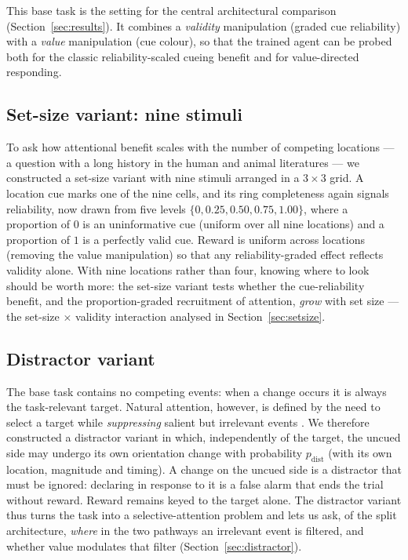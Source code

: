 This base task is the setting for the central architectural comparison
(Section~\ref{sec:results}). It combines a \emph{validity} manipulation (graded cue
reliability) with a \emph{value} manipulation (cue colour), so that the trained
agent can be probed both for the classic reliability-scaled cueing benefit and for
value-directed responding.

\subsection{Set-size variant: nine stimuli}
\label{sec:env-setsize}
To ask how attentional benefit scales with the number of competing locations --- a
question with a long history in the human and animal literatures
\citep{palmer1995psychophysics, mazyar2012does, eckstein2013visual} --- we
constructed a set-size variant with nine stimuli arranged in a $3\times3$ grid. A
location cue marks one of the nine cells, and its ring completeness again signals
reliability, now drawn from five levels $\{0, 0.25, 0.50, 0.75, 1.00\}$, where a
proportion of $0$ is an uninformative cue (uniform over all nine locations) and a
proportion of $1$ is a perfectly valid cue. Reward is uniform across locations
(removing the value manipulation) so that any reliability-graded effect reflects
validity alone. With nine locations rather than four, knowing where to look should
be worth more: the set-size variant tests whether the cue-reliability benefit, and
the proportion-graded recruitment of attention, \emph{grow} with set size --- the
set-size $\times$ validity interaction analysed in Section~\ref{sec:setsize}.

\subsection{Distractor variant}
\label{sec:env-distractor}
The base task contains no competing events: when a change occurs it is always the
task-relevant target. Natural attention, however, is defined by the need to select
a target while \emph{suppressing} salient but irrelevant events
\citep{desimone1995neural, sprague2018rescuing, cosman2018prefrontal}. We therefore
constructed a distractor variant in which, independently of the target, the uncued
side may undergo its own orientation change with probability $p_{\mathrm{dist}}$
(with its own location, magnitude and timing). A change on the uncued side is a
distractor that must be ignored: declaring in response to it is a false alarm that
ends the trial without reward. Reward remains keyed to the target alone. The
distractor variant thus turns the task into a selective-attention problem and lets
us ask, of the split architecture, \emph{where} in the two pathways an irrelevant
event is filtered, and whether value modulates that filter
(Section~\ref{sec:distractor}).

